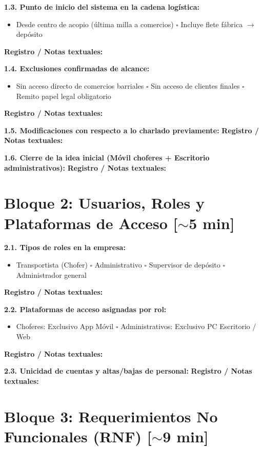 \documentclass[10pt,a4paper]{article}
\newcommand{\espacioNotas}[1]{%
  \vspace{2pt}%
  \noindent\textbf{\footnotesize Registro / Notas textuales:}\par
  \noindent\fbox{%
    \parbox{\dimexpr\textwidth-2\fboxsep-2\fboxrule\relax}{%
      \vspace{#1pt}%
    }%
  }%
  \vspace{3pt}%
}
\begin{document}
\noindent
\textbf{1.3. Punto de inicio del sistema en la cadena logística:}
\begin{itemize}[label=$\square$]
  \item Desde centro de acopio (última milla a comercios) \quad $\square$ Incluye flete fábrica $\rightarrow$ depósito
\end{itemize}
\espacioNotas{18}

\noindent
\textbf{1.4. Exclusiones confirmadas de alcance:}
\begin{itemize}[label=$\square$]
  \item Sin acceso directo de comercios barriales \quad $\square$ Sin acceso de clientes finales \quad $\square$ Remito papel legal obligatorio
\end{itemize}
\espacioNotas{16}

\noindent
\textbf{1.5. Modificaciones con respecto a lo charlado previamente:}
\espacioNotas{20}

\noindent
\textbf{1.6. Cierre de la idea inicial (Móvil choferes + Escritorio administrativos):}
\espacioNotas{22}

\section*{Bloque 2: Usuarios, Roles y Plataformas de Acceso [$\sim$5 min]}

\noindent
\textbf{2.1. Tipos de roles en la empresa:}
\begin{itemize}[label=$\square$]
  \item Transportista (Chofer) \quad $\square$ Administrativo \quad $\square$ Supervisor de depósito \quad $\square$ Administrador general
\end{itemize}
\espacioNotas{20}

\noindent
\textbf{2.2. Plataformas de acceso asignadas por rol:}
\begin{itemize}[label=$\square$]
  \item Choferes: Exclusivo App Móvil \quad $\square$ Administrativos: Exclusivo PC Escritorio / Web
\end{itemize}
\espacioNotas{18}

\noindent
\textbf{2.3. Unicidad de cuentas y altas/bajas de personal:}
\espacioNotas{22}

\clearpage

\section*{Bloque 3: Requerimientos No Funcionales (RNF) [$\sim$9 min]}
\end{document}
